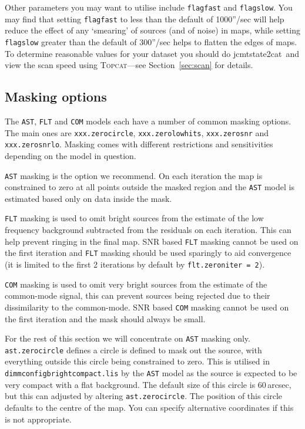 \documentclass[twoside,11pt]{article}
\newcommand{\htmladdnormallink}[2]{#1}
\newcommand{\htmlref}[2]{#1}
\newcommand{\latexhtml}[2]{#1}
\newcommand{\xref}[3]{#1}
\newcommand{\xlabel}[1]{}
\renewcommand{\_}{\texttt{\symbol{95}}}
\newcommand{\topcat}{\htmladdnormallink{\textsc{Topcat}}{http://www.starlink.ac.uk/topcat}}
\newcommand{\task}[1]{\textsf{#1}}
\newcommand{\jcmtstate}{\xref{\task{jcmtstate2cat}}{sun258}{JCMTSTATE2CAT}}
\newcommand{\cref}[3]{\latexhtml{#1~\ref{#2}}{\htmlref{#3}{#2}}}
\begin{document}
Other parameters you may want to utilise include \texttt{flagfast} and
\texttt{flagslow}. You may find that setting \texttt{flagfast} to less
than the default of 1000''/sec will help reduce the effect of any
`smearing' of sources (and of noise) in maps, while setting \texttt{flagslow} greater
than the default of 300''/sec helps to flatten the edges of maps. To
determine reasonable values for your dataset you should do \jcmtstate\
and view the scan speed using \topcat---see
\cref{Section}{sec:scan}{Displaying scan patterns} for details.

\subsection{\xlabel{mask}Masking options}
\label{sec:mask}

The \texttt{AST}, \texttt{FLT} and \texttt{COM} models each have a
number of common masking options. The main ones are
\texttt{xxx.zero\_circle}, \texttt{xxx.zero\_lowhits},
\texttt{xxx.zero\_snr} and \texttt{xxx.zero\_snrlo}. Masking comes
with different restrictions and sensitivities depending on the model
in question.

\texttt{AST} masking is the option we recommend. On each iteration the
map is constrained to zero at all points outside the masked region and
the \texttt{AST} model is estimated based only on data inside the
mask. 

\texttt{FLT} masking is used to omit bright sources from the estimate
of the low frequency background subtracted from the residuals on each
iteration. This can help prevent ringing in the final map. SNR based
\texttt{FLT} masking cannot be used on the first iteration and
\texttt{FLT} masking should be used sparingly to aid convergence (it
is limited to the first 2 iterations by default by
\texttt{flt.zero\_niter = 2}).

\texttt{COM} masking is used to omit very bright sources from the
estimate of the common-mode signal, this can prevent sources being
rejected due to their dissimilarity to the common-mode. SNR based
\texttt{COM} masking cannot be used on the first iteration and the
mask should always be small.

For the rest of this section we will concentrate on \texttt{AST}
masking only. \texttt{ast.zero\_circle} defines a circle is defined to
mask out the source, with everything outside this circle being
constrained to zero. This is utilised in
\texttt{dimmconfig\_bright\_compact.lis} by the \texttt{AST} model as
the source is expected to be very compact with a flat background. The
default size of this circle is 60\,arcsec, but this can adjusted by
altering \texttt{ast.zero\_circle}. The position of this circle
defaults to the centre of the map. You can specify alternative
coordinates if this is not appropriate.
\end{document}
